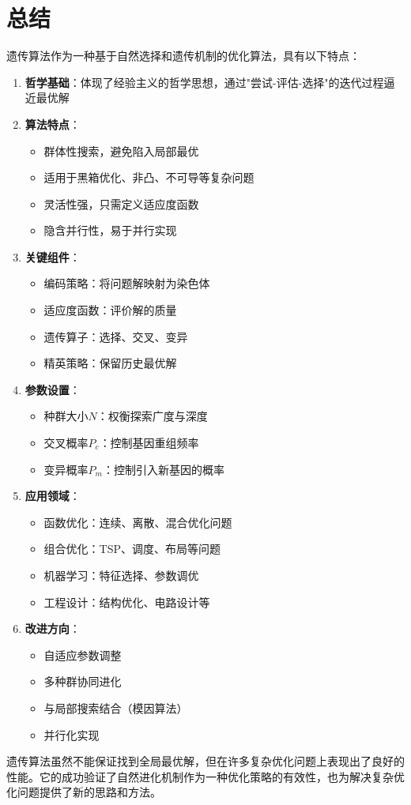 \section{总结}

遗传算法作为一种基于自然选择和遗传机制的优化算法，具有以下特点：

\begin{enumerate}
    \item \textbf{哲学基础}：体现了经验主义的哲学思想，通过"尝试-评估-选择"的迭代过程逼近最优解
    
    \item \textbf{算法特点}：
    \begin{itemize}
        \item 群体性搜索，避免陷入局部最优
        \item 适用于黑箱优化、非凸、不可导等复杂问题
        \item 灵活性强，只需定义适应度函数
        \item 隐含并行性，易于并行实现
    \end{itemize}
    
    \item \textbf{关键组件}：
    \begin{itemize}
        \item 编码策略：将问题解映射为染色体
        \item 适应度函数：评价解的质量
        \item 遗传算子：选择、交叉、变异
        \item 精英策略：保留历史最优解
    \end{itemize}
    
    \item \textbf{参数设置}：
    \begin{itemize}
        \item 种群大小$N$：权衡探索广度与深度
        \item 交叉概率$P_c$：控制基因重组频率
        \item 变异概率$P_m$：控制引入新基因的概率
    \end{itemize}
    
    \item \textbf{应用领域}：
    \begin{itemize}
        \item 函数优化：连续、离散、混合优化问题
        \item 组合优化：TSP、调度、布局等问题
        \item 机器学习：特征选择、参数调优
        \item 工程设计：结构优化、电路设计等
    \end{itemize}
    
    \item \textbf{改进方向}：
    \begin{itemize}
        \item 自适应参数调整
        \item 多种群协同进化
        \item 与局部搜索结合（模因算法）
        \item 并行化实现
    \end{itemize}
\end{enumerate}

遗传算法虽然不能保证找到全局最优解，但在许多复杂优化问题上表现出了良好的性能。它的成功验证了自然进化机制作为一种优化策略的有效性，也为解决复杂优化问题提供了新的思路和方法。
